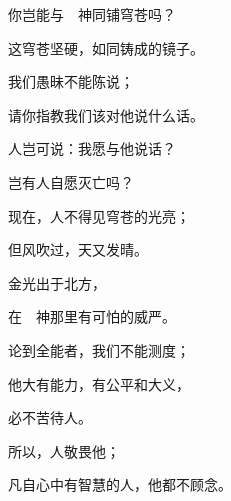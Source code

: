 {\par }{\Q {}你岂能与　神同铺穹苍吗？
\par }{\Q 这穹苍坚硬，如同铸成的镜子。
\par }{\Q {}我们愚昧不能陈说；
\par }{\Q 请你指教我们该对他说什么话。
\par }{\Q {}人岂可说：我愿与他说话？
\par }{\Q 岂有人自愿灭亡吗？
\par }{\BB \par }{\Q {}现在{}，人不得见穹苍的光亮；
\par }{\Q 但风吹过，天又发晴。
\par }{\Q {}金光出于北方，
\par }{\Q 在　神那里有可怕的威严。
\par }{\Q {}论到全能者，我们不能测度；
\par }{\Q 他大有能力，有公平和大义，
\par }{\Q 必不苦待人。
\par }{\Q {}所以，人敬畏他；
\par }{\Q 凡自{}心中有智慧的人，他都不顾念。

}
